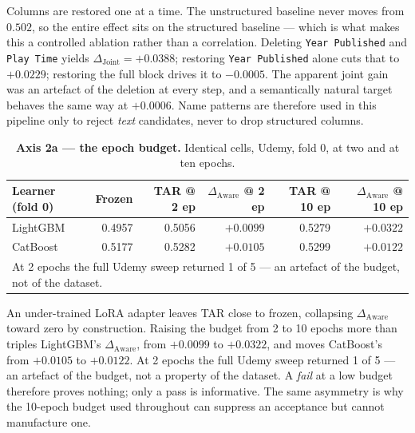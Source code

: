 \documentclass[10pt,letterpaper]{article}
\newcommand{\dj}{\Delta_{\mathrm{Joint}}}
\newcommand{\da}{\Delta_{\mathrm{Aware}}}
\begin{document}
\noindent Columns are restored one at a time. The unstructured baseline never moves from $0.502$, so the
entire effect sits on the structured baseline --- which is what makes this a controlled
ablation rather than a correlation. Deleting \texttt{Year Published} and \texttt{Play Time}
yields $\dj = +0.0388$; restoring \texttt{Year Published} alone cuts that to $+0.0229$;
restoring the full block drives it to $-0.0005$. The apparent joint gain was an artefact of the
deletion at every step, and a semantically natural target behaves the same way at $+0.0006$.
Name patterns are therefore used in this pipeline only to reject \emph{text} candidates, never
to drop structured columns.


\begin{table}[H]
\centering\small
\caption{\textbf{Axis 2a --- the epoch budget.} Identical cells, Udemy, fold 0, at two and at
ten epochs.}
\begin{tabular}{lrrrrr}
\toprule
Learner (fold 0) & Frozen & TAR @ 2 ep & $\da$ @ 2 ep & TAR @ 10 ep & $\da$ @ 10 ep \\
\midrule
LightGBM & 0.4957 & 0.5056 & $+0.0099$ & 0.5279 & $\mathbf{+0.0322}$ \\
CatBoost & 0.5177 & 0.5282 & $+0.0105$ & 0.5299 & $\mathbf{+0.0122}$ \\
\midrule
\multicolumn{6}{l}{At 2 epochs the full Udemy sweep returned 1 of 5 --- an artefact of the budget, not of the dataset.} \\
\bottomrule
\end{tabular}
\end{table}

\noindent An under-trained LoRA adapter leaves TAR close to frozen, collapsing $\da$ toward zero by
construction. Raising the budget from 2 to 10 epochs more than triples LightGBM's $\da$, from
$+0.0099$ to $+0.0322$, and moves CatBoost's from $+0.0105$ to $+0.0122$. At 2 epochs the full
Udemy sweep returned 1 of 5 --- an artefact of the budget, not a property of the dataset. A
\emph{fail} at a low budget therefore proves nothing; only a pass is informative. The same
asymmetry is why the 10-epoch budget used throughout can suppress an acceptance but cannot
manufacture one.
\end{document}

